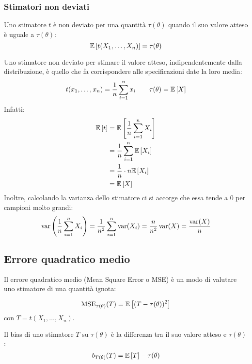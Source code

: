 \subsubsection{Stimatori non deviati}
\begin{defin}
	Uno stimatore $t$ è non deviato per una quantità $\tau(\theta)$ quando il suo valore atteso è uguale a $\tau(\theta)$:
	\begin{equation*}
		\mathbb{E}\left[ t(X_1,\dots,X_n) \right] = \tau(\theta)
	\end{equation*}
\end{defin}

\begin{examp}
	Uno stimatore non deviato per stimare il valore atteso, indipendentemente dalla distribuzione, è quello che fa corrispondere alle specificazioni date la loro media:
	\begin{equation*}
		t(x_1,\dots,x_n) = \frac{1}{n} \sum_{i=1}^n x_i \qquad \tau(\theta) = \mathbb{E}\left[ X \right]
	\end{equation*}
	Infatti:
	\begin{align*}
		\mathbb{E}\left[ t \right] & = \mathbb{E}\left[ \frac{1}{n} \sum_{i=1}^n X_i \right] \\
		       & = \frac{1}{n}\sum_{i=1}^n \mathbb{E}\left[ X_i \right]  \\
		       & = \frac{1}{n} \cdot n\mathbb{E}\left[ X_i \right]       \\
		       & = \mathbb{E}\left[ X \right]
	\end{align*}
	Inoltre, calcolando la varianza dello stimatore ci si accorge che essa tende a 0 per campioni molto grandi:
	\begin{equation*}
		\operatorname{var}\left(\frac{1}{n} \sum_{i=1}^n X_i\right) = \frac{1}{n^2} \sum_{i=1}^n \operatorname{var}(X_i) = \frac{n}{n^2}\operatorname{var}(X) = \frac{\operatorname{var}(X)}{n}
	\end{equation*}
\end{examp}


\subsection{Errore quadratico medio}
Il errore quadratico medio (Mean Square Error o MSE) è un modo di valutare uno stimatore di una quantità ignota:
\begin{defin}
	\begin{equation*}
		\operatorname{MSE}_{\tau(\theta)}(T) = \mathbb{E}\left[ (T-\tau(\theta))^2 \right]
	\end{equation*}
	con $T=t(X_1,\dots,X_n)$.
\end{defin}

\begin{defin}
	Il bias di uno stimatore $T$ su $\tau(\theta)$ è la differenza tra il suo valore atteso e $\tau(\theta)$:
	\begin{equation*}
		b_{T(\theta)}(T) = \mathbb{E}\left[ T \right] - \tau(\theta)
	\end{equation*}
\end{defin}

